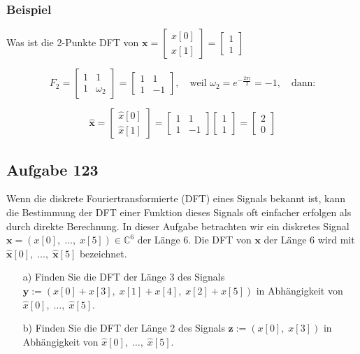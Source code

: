 \documentclass[11pt]{article}
\begin{document}
\subsubsection*{Beispiel}
\vspace*{-0.5cm}

Was ist die 2-Punkte DFT von $\mathbf{x} = \begin{bmatrix}
    x[0] \\
    x[1]
\end{bmatrix} = \begin{bmatrix}
    1 \\
    1
\end{bmatrix}$

$$F_2 = \begin{bmatrix}
    1 & 1 \\
    1 & \omega_2
\end{bmatrix} = \begin{bmatrix}
    1 & 1 \\
    1 & -1
\end{bmatrix}, \hspace{12pt} \text{weil } \omega_2 = e^{-\frac{2 \pi i}{2}} = -1, \hspace{12pt} \text{dann:}$$

$$ \hat{\mathbf{x}} = \begin{bmatrix}
    \hat{x}[0] \\
    \hat{x}[1]
\end{bmatrix} = \begin{bmatrix}
    1 & 1 \\
    1 & -1
\end{bmatrix} \begin{bmatrix}
    1 \\
    1
\end{bmatrix} = \begin{bmatrix}
    2 \\
    0
\end{bmatrix} $$

\subsection*{Aufgabe 123}
\vspace*{-0.5cm}

Wenn die diskrete Fouriertransformierte (DFT) eines Signals bekannt ist, kann die Bestimmung der DFT einer Funktion dieses Signals oft einfacher erfolgen als durch direkte Berechnung. In dieser Aufgabe betrachten wir ein diskretes Signal $\mathbf{x} = (x[0], \; \dots, \; x[5]) \in \mathbb{C}^6$ der Länge 6. Die DFT von $\mathbf{x}$ der Länge 6 wird mit $\hat{\mathbf{x}}[0], \; \dots, \; \hat{\mathbf{x}}[5]$ bezeichnet.
\vspace*{-0.5cm}
\begin{itemize}
    \item[a)] Finden Sie die DFT der Länge 3 des Signals $\mathbf{y}:= (x[0] + x[3], \; x[1] + x[4], \; x[2] + x[5])$ in Abhängigkeit von $\hat{x}[0], \; \dots, \; \hat{x}[5]$.
    \item[b)] Finden Sie die DFT der Länge 2 des Signals $\mathbf{z}:= (x[0], \; x[3])$ in Abhängigkeit von $\hat{x}[0], \; \dots, \; \hat{x}[5]$.
\end{itemize}
\end{document}

